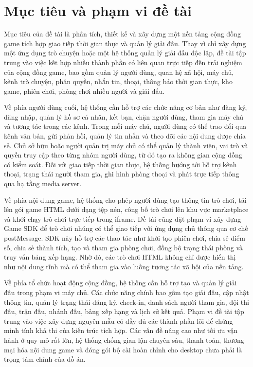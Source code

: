 \documentclass[../DoAn.tex]{subfiles}
\begin{document}
\section{Mục tiêu và phạm vi đề tài}
\label{section:1.2}

Mục tiêu của đề tài là phân tích, thiết kế và xây dựng một nền tảng cộng đồng game tích hợp giao tiếp thời gian thực và quản lý giải đấu. Thay vì chỉ xây dựng một ứng dụng trò chuyện hoặc một hệ thống quản lý giải đấu độc lập, đề tài tập trung vào việc kết hợp nhiều thành phần có liên quan trực tiếp đến trải nghiệm của cộng đồng game, bao gồm quản lý người dùng, quan hệ xã hội, máy chủ, kênh trò chuyện, phân quyền, nhắn tin, thoại, thông báo thời gian thực, kho game, phiên chơi, phòng chơi nhiều người và giải đấu.

Về phía người dùng cuối, hệ thống cần hỗ trợ các chức năng cơ bản như đăng ký, đăng nhập, quản lý hồ sơ cá nhân, kết bạn, chặn người dùng, tham gia máy chủ và tương tác trong các kênh. Trong mỗi máy chủ, người dùng có thể trao đổi qua kênh văn bản, gửi phản hồi, quản lý tin nhắn và theo dõi các nội dung được chia sẻ. Chủ sở hữu hoặc người quản trị máy chủ có thể quản lý thành viên, vai trò và quyền truy cập theo từng nhóm người dùng, từ đó tạo ra không gian cộng đồng có kiểm soát. Đối với giao tiếp thời gian thực, hệ thống hướng tới hỗ trợ kênh thoại, trạng thái người tham gia, ghi hình phòng thoại và phát trực tiếp thông qua hạ tầng media server.

Về phía nội dung game, hệ thống cho phép người dùng tạo thông tin trò chơi, tải lên gói game HTML dưới dạng tệp nén, công bố trò chơi lên khu vực marketplace và khởi chạy trò chơi trực tiếp trong iframe. Đề tài cũng đặt phạm vi xây dựng Game SDK để trò chơi nhúng có thể giao tiếp với ứng dụng chủ thông qua cơ chế postMessage. SDK này hỗ trợ các thao tác như khởi tạo phiên chơi, chia sẻ điểm số, chia sẻ thành tích, tạo và tham gia phòng chơi, đồng bộ trạng thái phòng và truy vấn bảng xếp hạng. Nhờ đó, các trò chơi HTML không chỉ được hiển thị như nội dung tĩnh mà có thể tham gia vào luồng tương tác xã hội của nền tảng.

Về phía tổ chức hoạt động cộng đồng, hệ thống cần hỗ trợ tạo và quản lý giải đấu trong phạm vi máy chủ. Các chức năng chính bao gồm tạo giải đấu, cập nhật thông tin, quản lý trạng thái đăng ký, check-in, danh sách người tham gia, đội thi đấu, trận đấu, nhánh đấu, bảng xếp hạng và lịch sử kết quả. Phạm vi đề tài tập trung vào việc xây dựng nguyên mẫu có đầy đủ các thành phần lõi để chứng minh tính khả thi của kiến trúc tích hợp. Các vấn đề nâng cao như tối ưu vận hành ở quy mô rất lớn, hệ thống chống gian lận chuyên sâu, thanh toán, thương mại hóa nội dung game và đóng gói bộ cài hoàn chỉnh cho desktop chưa phải là trọng tâm chính của đồ án.
\end{document}
